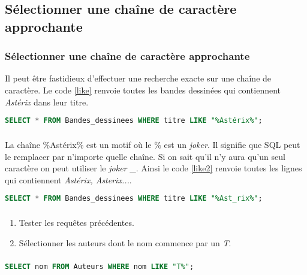 \documentclass[svgnames,11pt]{beamer}
\begin{document}
\subsection{Sélectionner une chaîne de caractère approchante}
\begin{frame}[fragile]
    \frametitle{Sélectionner une chaîne de caractère approchante}

    Il peut être fastidieux d'effectuer une recherche exacte sur une chaîne de caractère. Le code \ref{like} renvoie toutes les bandes dessinées qui contiennent \emph{Astérix} dans leur titre.
    \begin{center}
        \begin{lstlisting}[language=SQL , basicstyle=\ttfamily\small, xleftmargin=1em, xrightmargin=-1em]
SELECT * FROM Bandes_dessinees WHERE titre LIKE "%Astérix%";
\end{lstlisting}
        \label{like}
    \end{center}

\end{frame}
\begin{frame}[fragile]
    \frametitle{}

    La chaîne \%Astérix\% est un motif où le \% est un \emph{joker}. Il signifie que SQL peut le remplacer par n'importe quelle chaîne. Si on sait qu'il n'y aura qu'un seul caractère on peut utiliser le \emph{joker} \_. Ainsi le code \ref{like2} renvoie toutes les lignes qui contiennent \emph{Astérix, Asterix...}.
    \begin{center}
        \begin{lstlisting}[language=SQL , basicstyle=\ttfamily\small, xleftmargin=1em, xrightmargin=-1em]
SELECT * FROM Bandes_dessinees WHERE titre LIKE "%Ast_rix%";
\end{lstlisting}
        \label{like2}
    \end{center}

\end{frame}
\begin{frame}
    \frametitle{}
\begin{activite}
    \begin{enumerate}
        \item Tester les requêtes précédentes.
        \item Sélectionner les auteurs dont le nom commence par un \emph{T}.
    \end{enumerate}
    \end{activite}

\end{frame}
\begin{frame}[fragile]
    \frametitle{}

    \begin{center}
        \begin{lstlisting}[language=SQL , basicstyle=\ttfamily\small, xleftmargin=1em, xrightmargin=-1em]
SELECT nom FROM Auteurs WHERE nom LIKE "T%";
\end{lstlisting}
    \end{center}

\end{frame}
\end{document}
